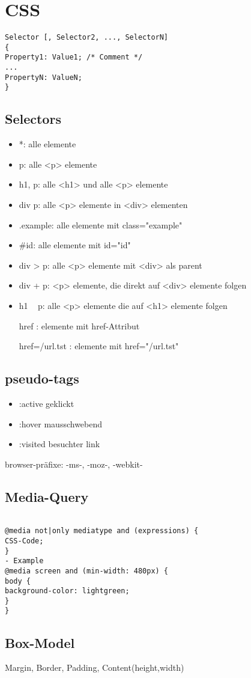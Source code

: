 \section*{CSS}
\begin{verbatim}
Selector [, Selector2, ..., SelectorN]
{
Property1: Value1; /* Comment */
...
PropertyN: ValueN;
}
\end{verbatim}

\subsection*{Selectors}
\begin{itemize}
\item *: alle elemente
\item p: alle <p> elemente
\item h1, p: alle <h1> und alle <p> elemente
\item div p: alle <p> elemente in <div> elementen
\item .example: alle elemente mit class="example"
\item \#id: alle elemente mit id="id"
\item div > p: alle <p> elemente mit <div> als parent
\item div + p: <p> elemente, die direkt auf <div> elemente folgen
\item h1 ~ p: alle <p> elemente die auf <h1> elemente folgen 
\item [href]: elemente mit href-Attribut
\item [href=/url.tst]: elemente mit href="/url.tst"
\end{itemize}
\subsection*{pseudo-tags}
\begin{itemize}
\item :active geklickt
\item :hover  mausschwebend
\item :visited besuchter link
\end{itemize}

browser-präfixe: -ms-, -moz-, -webkit-

\subsection*{Media-Query}
\begin{verbatim}

@media not|only mediatype and (expressions) {
CSS-Code;
}
- Example
@media screen and (min-width: 480px) {
body {
background-color: lightgreen;
}
}

\end{verbatim}

\subsection*{Box-Model}
Margin, Border, Padding, Content(height,width)
